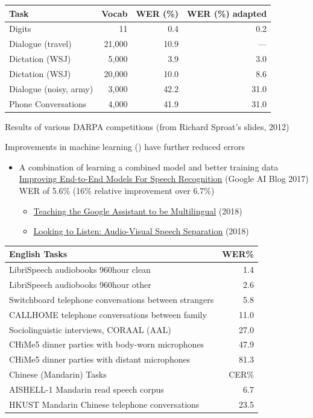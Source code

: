 \documentclass[a4paper,landscape,headrule,footrule,xetex]{foils}
\begin{document}

  \begin{tabular}{lrrr}
    Task & Vocab & WER (\%) & WER  (\%) adapted \\ \hline
    Digits & 11 & 0.4 & 0.2 \\
    Dialogue (travel) & 21,000 & 10.9 & --- \\
    Dictation (WSJ) & 5,000 & 3.9 & 3.0 \\
    Dictation (WSJ) & 20,000 & 10.0 & 8.6 \\
    Dialogue (noisy, army) & 3,000 & 42.2 & 31.0 \\
    Phone Conversations & 4,000 & 41.9 & 31.0 \\
  \end{tabular}

Results of various DARPA competitions (from Richard Sproat's slides, 2012)

Improvements in machine learning () have
further reduced errors

\begin{itemize}
\item A combination of learning a combined model and better training data
\\
\href{https://ai.googleblog.com/2017/12/improving-end-to-end-models-for-speech.html}{Improving
  End-to-End Models For Speech Recognition} (Google AI Blog 2017)
\\ WER of 5.6\% (16\% relative improvement over 6.7\%)
\begin{itemize}
\item
  \href{https://ai.googleblog.com/2018/08/Multilingual-Google-Assistant.html}{Teaching
    the Google Assistant to be Multilingual} (2018)
\item
  \href{https://ai.googleblog.com/2018/04/looking-to-listen-audio-visual-speech.html}{Looking
    to Listen: Audio-Visual Speech Separation} (2018)
\end{itemize}
\end{itemize}



\begin{tabular}{lr}
  English Tasks &  WER\% \\
  \hline
LibriSpeech audiobooks 960hour clean  & 1.4 \\
LibriSpeech audiobooks 960hour other  & 2.6 \\
Switchboard telephone conversations between strangers & 5.8 \\
CALLHOME telephone conversations between family & 11.0 \\
Sociolinguistic interviews, CORAAL (AAL) & 27.0 \\
CHiMe5 dinner parties with body-worn microphones & 47.9 \\
CHiMe5 dinner parties with distant microphones & 81.3 \\[2ex]
Chinese (Mandarin) Tasks &   CER\% \\ \hline
AISHELL-1 Mandarin read speech corpus & 6.7 \\
HKUST Mandarin Chinese telephone conversations &  23.5 \\
\end{tabular}
\end{document}

